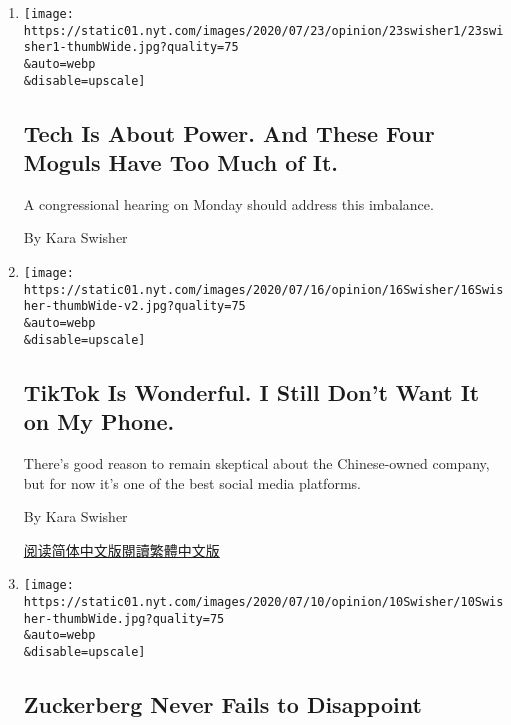 \begin{enumerate}
\def\labelenumi{\arabic{enumi}.}
\item
  \href{/2020/07/23/opinion/tech-moguls-congressional-hearing.html}{}

  \texttt{[image: https://static01.nyt.com/images/2020/07/23/opinion/23swisher1/23swisher1-thumbWide.jpg?quality=75\\\&auto=webp\\\&disable=upscale]}

  \hypertarget{tech-is-about-power-and-these-four-moguls-have-too-much-of-it}{%
  \subsection{Tech Is About Power. And These Four Moguls Have Too Much
  of
  It.}\label{tech-is-about-power-and-these-four-moguls-have-too-much-of-it}}

  A congressional hearing on Monday should address this imbalance.

  By Kara Swisher
\item
  \href{/2020/07/17/opinion/tiktok-ban-china.html}{}

  \texttt{[image: https://static01.nyt.com/images/2020/07/16/opinion/16Swisher/16Swisher-thumbWide-v2.jpg?quality=75\\\&auto=webp\\\&disable=upscale]}

  \hypertarget{tiktok-is-wonderful-i-still-dont-want-it-on-my-phone}{%
  \subsection{TikTok Is Wonderful. I Still Don't Want It on My
  Phone.}\label{tiktok-is-wonderful-i-still-dont-want-it-on-my-phone}}

  There's good reason to remain skeptical about the Chinese-owned
  company, but for now it's one of the best social media platforms.

  By Kara Swisher

  \href{https://cn.nytimes.com/opinion/20200720/tiktok-ban-china/}{阅读简体中文版}\href{https://cn.nytimes.com/opinion/20200720/tiktok-ban-china/zh-hant/}{閱讀繁體中文版}
\item
  \href{/2020/07/10/opinion/facebook-zuckerberg.html}{}

  \texttt{[image: https://static01.nyt.com/images/2020/07/10/opinion/10Swisher/10Swisher-thumbWide.jpg?quality=75\\\&auto=webp\\\&disable=upscale]}

  \hypertarget{zuckerberg-never-fails-to-disappoint}{%
  \subsection{Zuckerberg Never Fails to
  Disappoint}\label{zuckerberg-never-fails-to-disappoint}}


\end{enumerate}
